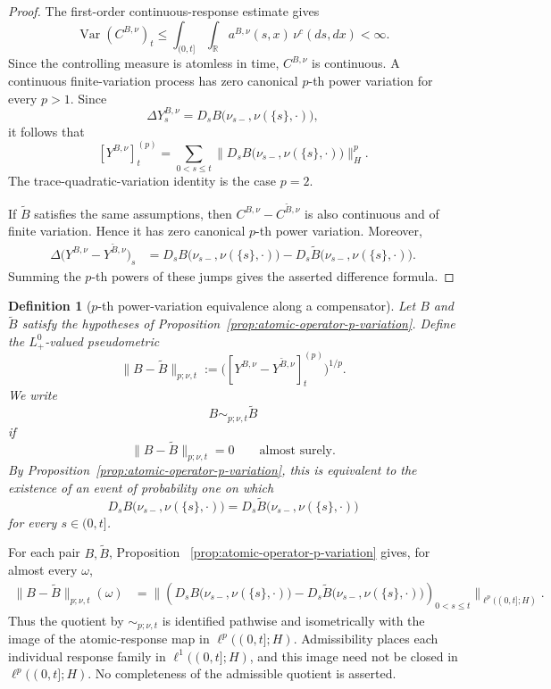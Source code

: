 \documentclass[a4paper,10pt]{article}
\newtheorem{defin}[thm]{Definition}
\begin{document}
\begin{proof}
The first-order continuous-response estimate gives
\[
\operatorname{Var}(C^{B,\nu})_t
\le
\int_{(0,t]}\int_{\mathbb R}
a^{B,\nu}(s,x)\,\nu^c(ds,dx)
<
\infty.
\]
Since the controlling measure is atomless in time,
\(C^{B,\nu}\) is continuous. A continuous finite-variation process has
zero canonical \(p\)-th power variation for every \(p>1\). Since
\[
\Delta Y_s^{B,\nu}
=
D_sB\bigl(\nu_{s-},\nu(\{s\},\cdot)\bigr),
\]
it follows that
\[
[Y^{B,\nu}]^{(p)}_t
=
\sum_{0<s\le t}
\lVert
D_sB\bigl(\nu_{s-},\nu(\{s\},\cdot)\bigr)
\rVert_H^p.
\]
The trace-quadratic-variation identity is the case \(p=2\).

If \(\widetilde B\) satisfies the same assumptions, then
$
C^{B,\nu}-C^{\widetilde B,\nu}
$
is also continuous and of finite variation. Hence it has zero
canonical \(p\)-th power variation. Moreover,
\[
\begin{aligned}
\Delta\bigl(
Y^{B,\nu}-Y^{\widetilde B,\nu}
\bigr)_s
&=
D_sB\bigl(\nu_{s-},\nu(\{s\},\cdot)\bigr)
-
D_s\widetilde B
\bigl(\nu_{s-},\nu(\{s\},\cdot)\bigr).
\end{aligned}
\]
Summing the \(p\)-th powers of these jumps gives the asserted
difference formula.
\end{proof}

\begin{defin}[\(p\)-th power-variation equivalence along a compensator]
Let \(B\) and \(\widetilde B\) satisfy the hypotheses of
Proposition~\ref{prop:atomic-operator-p-variation}. Define the
\(L^0_+\)-valued pseudometric
\[
\lVert B-\widetilde B\rVert_{p;\nu,t}
:=
\bigl(
[Y^{B,\nu}-Y^{\widetilde B,\nu}]^{(p)}_t
\bigr)^{1/p}.
\]
We write
\[
B\sim_{p;\nu,t}\widetilde B
\]
if
\[
\lVert B-\widetilde B\rVert_{p;\nu,t}=0
\qquad\text{almost surely}.
\]
By Proposition~\ref{prop:atomic-operator-p-variation}, this is
equivalent to the existence of an event of probability one on which
\[
D_sB\bigl(\nu_{s-},\nu(\{s\},\cdot)\bigr)
=
D_s\widetilde B
\bigl(\nu_{s-},\nu(\{s\},\cdot)\bigr)
\]
for every \(s\in(0,t]\).
\end{defin}

For each pair \(B,\widetilde B\), Proposition~
\ref{prop:atomic-operator-p-variation} gives, for almost every
\(\omega\),
\[
\begin{aligned}
\lVert B-\widetilde B\rVert_{p;\nu,t}(\omega)
&=
\Biggl\lVert
\left(
D_sB\bigl(\nu_{s-},\nu(\{s\},\cdot)\bigr)
-
D_s\widetilde B
\bigl(\nu_{s-},\nu(\{s\},\cdot)\bigr)
\right)_{0<s\le t}
\Biggr\rVert_{\ell^p((0,t];H)}.
\end{aligned}
\]
Thus the quotient by \(\sim_{p;\nu,t}\) is identified pathwise and
isometrically with the image of the atomic-response map in
\(\ell^p((0,t];H)\). Admissibility places each individual response
family in \(\ell^1((0,t];H)\), and this image need not be closed in
\(\ell^p((0,t];H)\). No completeness of the admissible quotient is
asserted.
\end{document}
